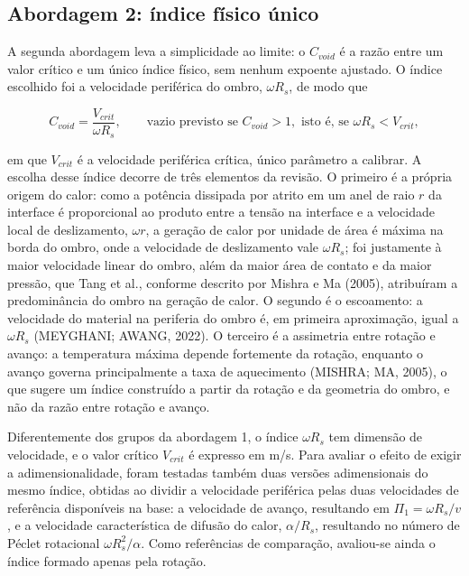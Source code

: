 \documentclass[12pt,openany]{report}
\begin{document}
\subsection{Abordagem 2: índice físico único}
\label{sec:abordagem_a}

A segunda abordagem leva a simplicidade ao limite: o $C_{void}$ é a razão entre um valor crítico e um único índice físico, sem nenhum expoente ajustado. O índice escolhido foi a velocidade periférica do ombro, $\omega R_s$, de modo que

\begin{equation}
C_{void} = \frac{V_{crit}}{\omega R_s}, \qquad \text{vazio previsto se } C_{void} > 1, \text{ isto é, se } \omega R_s < V_{crit},
\label{eq:cvoid_a}
\end{equation}

\noindent em que $V_{crit}$ é a velocidade periférica crítica, único parâmetro a calibrar. A escolha desse índice decorre de três elementos da revisão. O primeiro é a própria origem do calor: como a potência dissipada por atrito em um anel de raio $r$ da interface é proporcional ao produto entre a tensão na interface e a velocidade local de deslizamento, $\omega r$, a geração de calor por unidade de área é máxima na borda do ombro, onde a velocidade de deslizamento vale $\omega R_s$; foi justamente à maior velocidade linear do ombro, além da maior área de contato e da maior pressão, que Tang et al., conforme descrito por Mishra e Ma (2005), atribuíram a predominância do ombro na geração de calor. O segundo é o escoamento: a velocidade do material na periferia do ombro é, em primeira aproximação, igual a $\omega R_s$ (MEYGHANI; AWANG, 2022). O terceiro é a assimetria entre rotação e avanço: a temperatura máxima depende fortemente da rotação, enquanto o avanço governa principalmente a taxa de aquecimento (MISHRA; MA, 2005), o que sugere um índice construído a partir da rotação e da geometria do ombro, e não da razão entre rotação e avanço.

Diferentemente dos grupos da abordagem 1, o índice $\omega R_s$ tem dimensão de velocidade, e o valor crítico $V_{crit}$ é expresso em m/s. Para avaliar o efeito de exigir a adimensionalidade, foram testadas também duas versões adimensionais do mesmo índice, obtidas ao dividir a velocidade periférica pelas duas velocidades de referência disponíveis na base: a velocidade de avanço, resultando em $\Pi_1 = \omega R_s/v$, e a velocidade característica de difusão do calor, $\alpha/R_s$, resultando no número de Péclet rotacional $\omega R_{s}^{2}/\alpha$. Como referências de comparação, avaliou-se ainda o índice formado apenas pela rotação.
\end{document}

